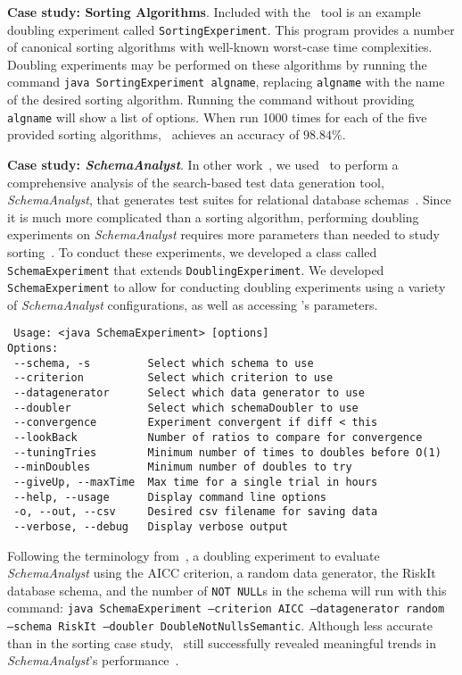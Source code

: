     \lstset{language=bash}

    {\bf Case study: Sorting Algorithms}.  Included with the
    \toolname~tool is an example doubling experiment called
    \texttt{SortingExperiment}.  This program provides a number of
    canonical sorting algorithms with well-known worst-case time
    complexities.  Doubling experiments may be performed on these
    algorithms by running the command \texttt{java SortingExperiment
    algname}, replacing \texttt{algname} with the name of the desired
    sorting algorithm. Running the command without providing
    \texttt{algname} will show a list of options. When run 1000 times
    for each of the five provided sorting algorithms, \toolname~achieves
    an accuracy of $98.84\%$.

    {\bf Case study: \textit{SchemaAnalyst}}. In other work~\cite{kinneer2015},
    we used \toolname~to perform a comprehensive analysis of the search-based
    test data generation tool, \textit{SchemaAnalyst}, that generates test
    suites for relational database schemas~\cite{kapfhammer2013}. Since it is
    much more complicated than a sorting algorithm, performing doubling
    experiments on \textit{SchemaAnalyst} requires more parameters than needed
    to study sorting~\cite{kempka2015}.  To conduct these experiments, we
    developed a class called \texttt{SchemaExperiment} that extends
    \texttt{DoublingExperiment}.  We developed \texttt{SchemaExperiment} to
    allow for conducting doubling experiments using a variety of
    \textit{SchemaAnalyst} configurations, as well as accessing \toolname's
    parameters.

    \vspace*{-.075in}

{\scriptsize
\begin{verbatim}
 Usage: <java SchemaExperiment> [options]
Options:
 --schema, -s         Select which schema to use
 --criterion          Select which criterion to use
 --datagenerator      Select which data generator to use
 --doubler            Select which schemaDoubler to use
 --convergence        Experiment convergent if diff < this
 --lookBack           Number of ratios to compare for convergence
 --tuningTries        Minimum number of times to doubles before O(1)
 --minDoubles         Minimum number of doubles to try
 --giveUp, --maxTime  Max time for a single trial in hours
 --help, --usage      Display command line options
 -o, --out, --csv     Desired csv filename for saving data 
 --verbose, --debug   Display verbose output
\end{verbatim}
}

\vspace*{-.075in}

Following the terminology from~\cite{kinneer2015}, a doubling experiment
to evaluate \textit{SchemaAnalyst} using the AICC criterion, a random
data generator, the RiskIt database schema, and the number of
\texttt{NOT NULL}s in the schema will run with this command:
\texttt{java SchemaExperiment --criterion AICC --datagenerator random
--schema RiskIt --doubler DoubleNotNullsSemantic}.  Although less accurate
than in the sorting case study, \toolname~still successfully revealed
meaningful trends in \textit{SchemaAnalyst}'s
performance~\cite{kinneer2015}.



